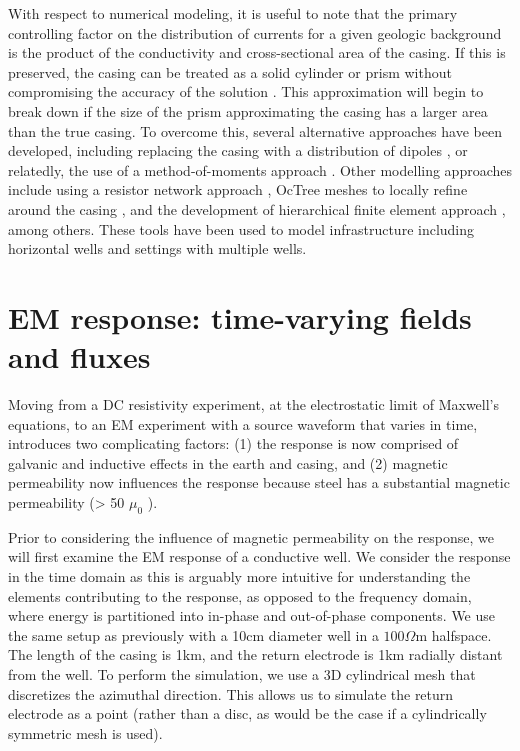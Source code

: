 \documentclass[
    paper
]{geophysics}
\begin{document}
With respect to numerical modeling, it is useful to note that the primary controlling factor on the distribution of currents for a given geologic background is the product of the conductivity and cross-sectional area of the casing. If this is preserved, the casing can be treated as a solid cylinder or prism without compromising the accuracy of the solution \citep{Heagy2019}. This approximation will begin to break down if the size of the prism approximating the casing has a larger area than the true casing. To overcome this, several alternative approaches have been developed, including replacing the casing with a distribution of dipoles \citep{Cuevas2014}, or relatedly, the use of a method-of-moments approach \citep{Tang2015, Orujov2020}. Other modelling approaches include using a resistor network approach \citep{Yang2016}, OcTree meshes to locally refine around the casing \citep{Haber2016}, and the development of hierarchical finite element approach \citep{Weiss2017}, among others. These tools have been used to model infrastructure including horizontal wells and settings with multiple wells.






\section{EM response: time-varying fields and fluxes}

Moving from a DC resistivity experiment, at the electrostatic limit of Maxwell’s equations, to an EM experiment with a source waveform that varies in time, introduces two complicating factors: (1) the response is now comprised of galvanic and inductive effects in the earth and casing, and (2) magnetic permeability now  influences the response because steel has a substantial magnetic permeability (> 50 $\mu_0$ \cite{Wu1994}).

Prior to considering the influence of magnetic permeability on the response, we will first examine the EM response of a conductive well. We consider the response in the time domain as this is arguably more intuitive for understanding the elements contributing to the response, as opposed to the frequency domain, where energy is partitioned into in-phase and out-of-phase components. We use the same setup as previously with a 10cm diameter well in a $100 \Omega$m halfspace. The length of the casing is 1km, and the return electrode is 1km radially distant from the well. To perform the simulation, we use a 3D cylindrical mesh that discretizes the azimuthal direction. This allows us to simulate the return electrode as a point (rather than a disc, as would be the case if a cylindrically symmetric mesh is used).
\end{document}
